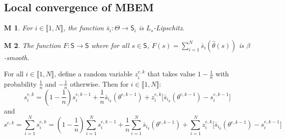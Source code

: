 \documentclass[11pt]{article}
\theoremstyle{plain}
\newtheorem{assumption}{M}
\newcommand{\inter}{\llbracket1,N\rrbracket}
\theoremstyle{plain}
\theoremstyle{definition}
\begin{document}
\subsection{Local convergence of MBEM}
\begin{assumption}
For $i \in \inter$,  the function $\bar{s}_i: \Theta \to \mathsf{S}_i$ is $L_s$-Lipschitz.
\end{assumption}

\begin{assumption}
The function $F: \mathsf{S} \to \mathsf{S}$ where for all $s \in  \mathsf{S}$, $F(s) = \sum_{i=1}^N \bar{s}_i (\hat{\theta}(s))$ is $\beta$-smooth.
\end{assumption}
For all $i \in \inter$, define a random variable $z_i^{e,k}$ that takes value $1-\frac{1}{n}$ with probability $\frac{1}{n}$ and $-\frac{1}{n}$ otherwise. Then for $i \in \inter$:
\begin{equation}
s_i^{e,k} = (1-\frac{1}{n}) s_i^{e,k-1} + \frac{1}{n}\bar{s}_{i_k}(\theta^{e,k-1}) + z_i^{e,k} \Big[\bar{s}_{i_k}(\theta^{e,k-1}) - s_i^{e,k-1}\Big]
\end{equation}
and
\begin{equation}
s^{e,k} =  \sum_{i=1}^N s_i^{e,k} = (1-\frac{1}{n})  \sum_{i=1}^N s_i^{e,k-1} + \frac{1}{n}  \sum_{i=1}^N \bar{s}_{i_k}(\theta^{e,k-1}) +  \sum_{i=1}^N z_i^{e,k} \Big[\bar{s}_{i_k}(\theta^{e,k-1}) - s_i^{e,k-1}\Big]
\end{equation}
\end{document}
